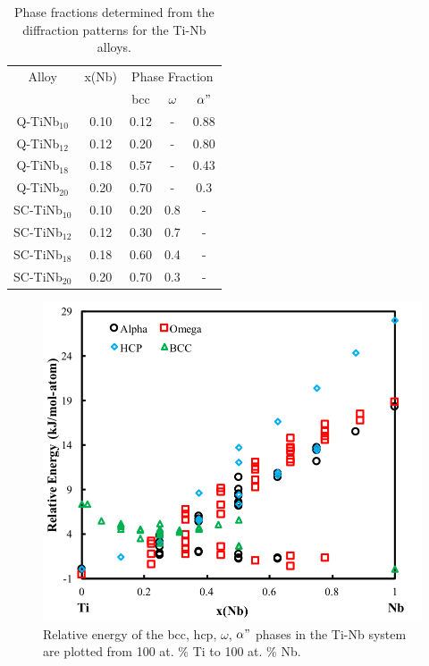 \newpage
\begin{table}[H]
	\caption{Phase fractions determined from the diffraction patterns for the Ti-Nb alloys.}
	\centering
	\begin{tabular}{ c c c c c }
		\hline
		Alloy & x(Nb) & \multicolumn{3}{c}{Phase Fraction} \\
		&  & bcc & $\omega$ & $\alpha"$ \\
		\hline
		Q-TiNb$_{10}$ & 0.10 & 0.12 & - & 0.88 \\
		Q-TiNb$_{12}$ & 0.12 & 0.20 & - & 0.80 \\
		Q-TiNb$_{18}$ & 0.18 & 0.57 & - & 0.43 \\
		Q-TiNb$_{20}$ & 0.20 & 0.70 & - & 0.3 \\
		SC-TiNb$_{10}$ & 0.10 & 0.20 & 0.8 & - \\
		SC-TiNb$_{12}$ & 0.12 & 0.30 & 0.7 & - \\
		SC-TiNb$_{18}$ & 0.18 & 0.60 & 0.4 & - \\
		SC-TiNb$_{20}$ & 0.20 & 0.70 & 0.3 & - \\
		\hline
	\end{tabular}
	\label{Ch7-table:phasefrac}
\end{table}
\clearpage

\pagebreak
\begin{figure}[H]
	\centering
	\includegraphics[width=\textwidth]{Chapter-7/Figures/tinb0k.png}
	\caption{Relative energy of the bcc, hcp, $\omega$, $\alpha"$ phases in the Ti-Nb system are plotted from 100 at. \% Ti to 100 at. \% Nb.}
	\label{Ch7-figure:tinb0K}
\end{figure}

